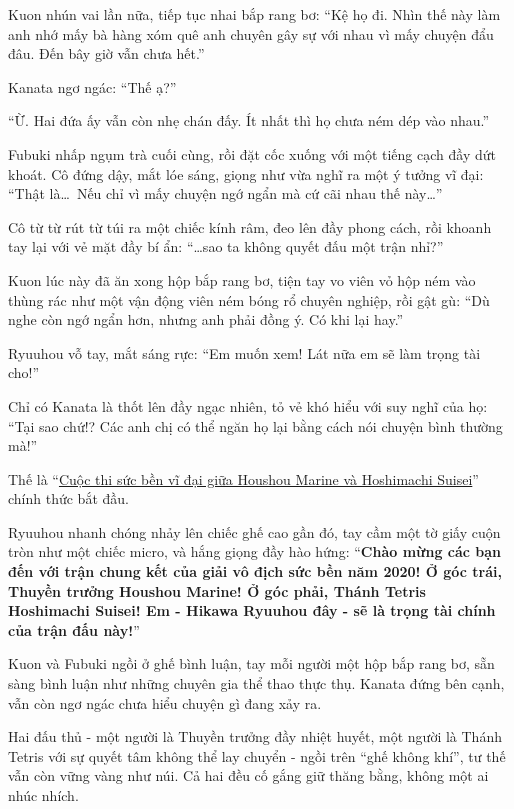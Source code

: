\documentclass[../main.tex]{subfiles}
\begin{document}
Kuon nhún vai lần nữa, tiếp tục nhai bắp rang bơ: ``Kệ họ đi. Nhìn thế này làm anh nhớ mấy bà hàng xóm quê anh chuyên gây sự với nhau vì mấy chuyện đẩu đâu. Đến bây giờ vẫn chưa hết.''

Kanata ngơ ngác: ``Thế ạ?''

``Ừ. Hai đứa ấy vẫn còn nhẹ chán đấy. Ít nhất thì họ chưa ném dép vào nhau.''

Fubuki nhấp ngụm trà cuối cùng, rồi đặt cốc xuống với một tiếng cạch đầy dứt khoát. Cô đứng dậy, mắt lóe sáng, giọng như vừa nghĩ ra một ý tưởng vĩ đại: ``Thật là\dots\ Nếu chỉ vì mấy chuyện ngớ ngẩn mà cứ cãi nhau thế này\dots''

Cô từ từ rút từ túi ra một chiếc kính râm, đeo lên đầy phong cách, rồi khoanh tay lại với vẻ mặt đầy bí ẩn: ``\dots sao ta không quyết đấu một trận nhỉ?''

Kuon lúc này đã ăn xong hộp bắp rang bơ, tiện tay vo viên vỏ hộp ném vào thùng rác như một vận động viên ném bóng rổ chuyên nghiệp, rồi gật gù: ``Dù nghe còn ngớ ngẩn hơn, nhưng anh phải đồng ý. Có khi lại hay.''

Ryuuhou vỗ tay, mắt sáng rực: ``Em muốn xem! Lát nữa em sẽ làm trọng tài cho!''

Chỉ có Kanata là thốt lên đầy ngạc nhiên, tỏ vẻ khó hiểu với suy nghĩ của họ: ``Tại sao chứ!? Các anh chị có thể ngăn họ lại bằng cách nói chuyện bình thường mà!''

\ct

Thế là ``\uline{Cuộc thi sức bền vĩ đại giữa Houshou Marine và Hoshimachi Suisei}'' chính thức bắt đầu.

Ryuuhou nhanh chóng nhảy lên chiếc ghế cao gần đó, tay cầm một tờ giấy cuộn tròn như một chiếc micro, và hắng giọng đầy hào hứng: ``\textbf{Chào mừng các bạn đến với trận chung kết của giải vô địch sức bền năm 2020! Ở góc trái, Thuyền trưởng Houshou Marine! Ở góc phải, Thánh Tetris Hoshimachi Suisei! Em - Hikawa Ryuuhou đây - sẽ là trọng tài chính của trận đấu này!}''

Kuon và Fubuki ngồi ở ghế bình luận, tay mỗi người một hộp bắp rang bơ, sẵn sàng bình luận như những chuyên gia thể thao thực thụ. Kanata đứng bên cạnh, vẫn còn ngơ ngác chưa hiểu chuyện gì đang xảy ra.

Hai đấu thủ - một người là Thuyền trưởng đầy nhiệt huyết, một người là Thánh Tetris với sự quyết tâm không thể lay chuyển - ngồi trên ``ghế không khí'', tư thế vẫn còn vững vàng như núi. Cả hai đều cố gắng giữ thăng bằng, không một ai nhúc nhích.

\end{document}
